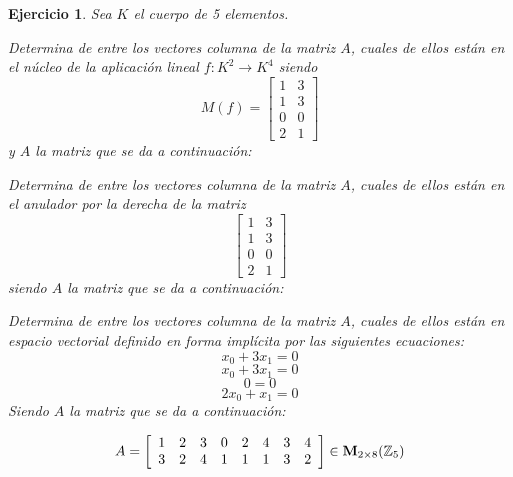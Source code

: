 \documentclass[12pt]{amsart}
\newtheorem{ejer}{Ejercicio}
\begin{document}
\begin{ejer} Sea $K$ el cuerpo de 5 elementos.
\newline
\noindent\begin{minipage}{\textwidth}
\begin{tcolorbox}[colback = green!20!white,title=Versión Núcleo]
Determina de entre los vectores columna de la matriz $A$, cuales de ellos están en el núcleo de la aplicación lineal $f:K^{2} \to K^{4}$ siendo  $$ M(f) = \left[\begin{array}{rr}
1 & 3 \\
1 & 3 \\
0 & 0 \\
2 & 1
\end{array}\right] $$ y $A$ la matriz que se da a continuación:\end{tcolorbox}
\end{minipage} \newline
\noindent\begin{minipage}{\textwidth}
\begin{tcolorbox}[colback = blue!20!white,title=Versión Anulador]
Determina de entre los vectores columna de la matriz $A$, cuales de ellos están en el anulador por la derecha de la matriz $$ \left[\begin{array}{rr}
1 & 3 \\
1 & 3 \\
0 & 0 \\
2 & 1
\end{array}\right] $$ siendo $A$ la matriz que se da a continuación:\end{tcolorbox}
\end{minipage} \newline
\noindent\begin{minipage}{\textwidth} 
\begin{tcolorbox}[colback = red!20!white,title=Versión Ecuaciones Implícitas]
Determina de entre los vectores columna de la matriz $A$, cuales de ellos están en espacio vectorial definido en forma implícita por las siguientes ecuaciones:
\[ x_{0} + 3 x_{1} = 0 \]
\[ x_{0} + 3 x_{1} = 0 \]
\[ 0 = 0 \]
\[ 2 x_{0} + x_{1} = 0 \]
Siendo $A$ la matriz que se da a continuación:
\end{tcolorbox}
\end{minipage}
\[ A = \left[\begin{array}{rrrrrrrr}
1 & 2 & 3 & 0 & 2 & 4 & 3 & 4 \\
3 & 2 & 4 & 1 & 1 & 1 & 3 & 2
\end{array}\right] \in {\bf M}_{2\times 8}({\mathbb Z}_{5})\]
\end{ejer}
\end{document}
